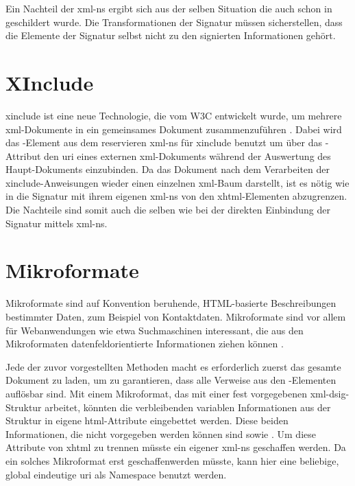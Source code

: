 

Ein Nachteil der \gls{xml-ns} ergibt sich aus der selben Situation die auch schon in  geschildert wurde. Die
Transformationen der Signatur müssen sicherstellen, dass die Elemente der Signatur selbst nicht zu den signierten Informationen gehört.

\section{XInclude}
\label{sec:Signaturbindung:XInclude}
\gls{xinclude} ist eine neue Technologie, die vom W3C entwickelt wurde, um mehrere \gls{xml}-Dokumente in ein gemeinsames Dokument zusammenzuführen
\cite{xml:oreilly}. Dabei wird das -Element aus dem reservieren \gls{xml-ns} für \gls{xinclude} benutzt um über das
-Attribut den \gls{uri} eines externen \gls{xml}-Dokuments während der Auswertung des Haupt-Dokuments einzubinden. Da das Dokument nach
dem Verarbeiten der \gls{xinclude}-Anweisungen wieder einen einzelnen \gls{xml}-Baum darstellt, ist es nötig wie in  die
Signatur mit ihrem eigenen \gls{xml-ns} von den \gls{xhtml}-Elementen abzugrenzen. Die Nachteile sind somit auch die selben wie bei der direkten Einbindung der
Signatur mittels \gls{xml-ns}.




\section{Mikroformate}
Mikroformate sind auf Konvention beruhende, HTML-basierte Beschreibungen bestimmter Daten, zum Beispiel von Kontaktdaten. Mikroformate sind vor allem für
Webanwendungen wie etwa Suchmaschinen interessant, die aus den Mikroformaten datenfeldorientierte Informationen ziehen können \cite{mikroformate}.

Jede der zuvor vorgestellten Methoden macht es erforderlich zuerst das gesamte Dokument zu laden, um zu garantieren, dass alle Verweise aus den
-Elementen auflösbar sind. Mit einem Mikroformat, das mit einer fest vorgegebenen \gls{xml-dsig}-Struktur arbeitet, könnten die verbleibenden
variablen Informationen aus der Struktur in eigene \gls{html}-Attribute eingebettet werden. Diese beiden Informationen, die nicht vorgegeben werden können sind
 sowie . Um diese Attribute von \gls{xhtml} zu trennen müsste ein eigener \gls{xml-ns} geschaffen werden. Da ein
solches Mikroformat erst geschaffenwerden müsste, kann hier eine beliebige, global eindeutige \gls{uri} als Namespace benutzt werden.

